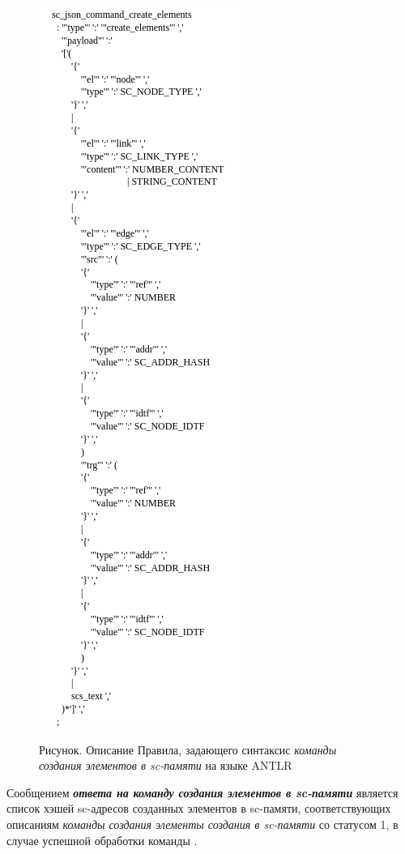 \begin{figure}[H]
	\center
	\caption{Рисунок. Описание Правила, задающего синтаксис \textit{команды создания элементов в sc-памяти} на языке ANTLR}
	\includegraphics[scale=0.8]{author/part6/figures/create_elements_command.png}
	\label{fig:create_elements_command}
\end{figure}

Сообщением \textbf{\textit{ответа на команду создания элементов в sc-памяти}} является список хэшей sc-адресов созданных элементов в sc-памяти, соответствующих описаниям \textit{команды создания элементы создания в sc-памяти} со статусом 1, в случае успешной обработки команды .

